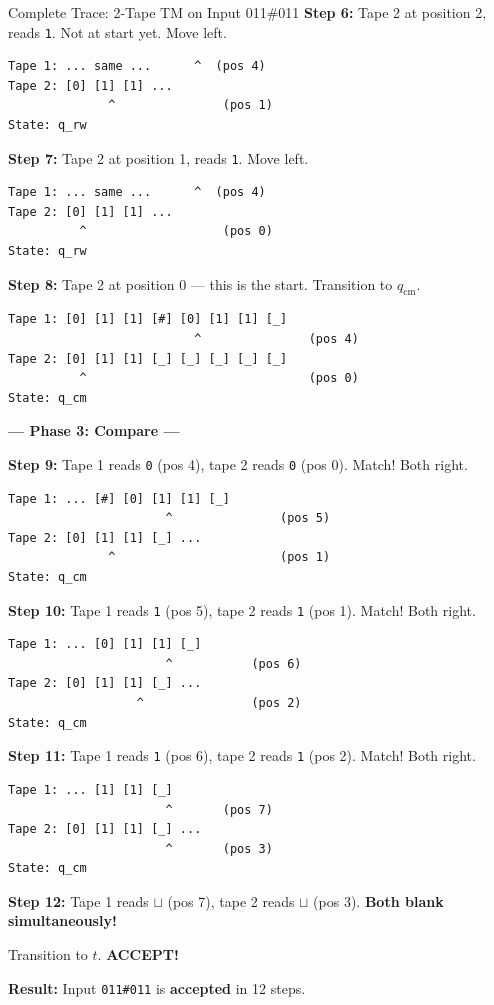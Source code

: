 \documentclass[11pt,a4paper]{article}
\begin{document}
\begin{examplebox}{{Complete Trace: 2-Tape TM on Input 011\#011}}
\textbf{Step 6:} Tape 2 at position 2, reads \texttt{1}. Not at start yet. Move left.
\begin{lstlisting}
Tape 1: ... same ...      ^  (pos 4)
Tape 2: [0] [1] [1] ...
              ^               (pos 1)
State: q_rw
\end{lstlisting}

\textbf{Step 7:} Tape 2 at position 1, reads \texttt{1}. Move left.
\begin{lstlisting}
Tape 1: ... same ...      ^  (pos 4)
Tape 2: [0] [1] [1] ...
          ^                   (pos 0)
State: q_rw
\end{lstlisting}

\textbf{Step 8:} Tape 2 at position 0 --- this is the start. Transition to $q_{\text{cm}}$.
\begin{lstlisting}
Tape 1: [0] [1] [1] [#] [0] [1] [1] [_]
                          ^               (pos 4)
Tape 2: [0] [1] [1] [_] [_] [_] [_] [_]
          ^                               (pos 0)
State: q_cm
\end{lstlisting}

\textbf{--- Phase 3: Compare ---}

\textbf{Step 9:} Tape 1 reads \texttt{0} (pos 4), tape 2 reads \texttt{0} (pos 0). Match! Both right.
\begin{lstlisting}
Tape 1: ... [#] [0] [1] [1] [_]
                      ^               (pos 5)
Tape 2: [0] [1] [1] [_] ...
              ^                       (pos 1)
State: q_cm
\end{lstlisting}

\textbf{Step 10:} Tape 1 reads \texttt{1} (pos 5), tape 2 reads \texttt{1} (pos 1). Match! Both right.
\begin{lstlisting}
Tape 1: ... [0] [1] [1] [_]
                      ^           (pos 6)
Tape 2: [0] [1] [1] [_] ...
                  ^               (pos 2)
State: q_cm
\end{lstlisting}

\textbf{Step 11:} Tape 1 reads \texttt{1} (pos 6), tape 2 reads \texttt{1} (pos 2). Match! Both right.
\begin{lstlisting}
Tape 1: ... [1] [1] [_]
                      ^       (pos 7)
Tape 2: [0] [1] [1] [_] ...
                      ^       (pos 3)
State: q_cm
\end{lstlisting}

\textbf{Step 12:} Tape 1 reads $\sqcup$ (pos 7), tape 2 reads $\sqcup$ (pos 3). \textbf{Both blank simultaneously!}

Transition to $t$. \textbf{ACCEPT!}

\medskip
\textbf{Result:} Input \texttt{011\#011} is \textbf{accepted} in 12 steps.
\end{examplebox}
\end{document}
